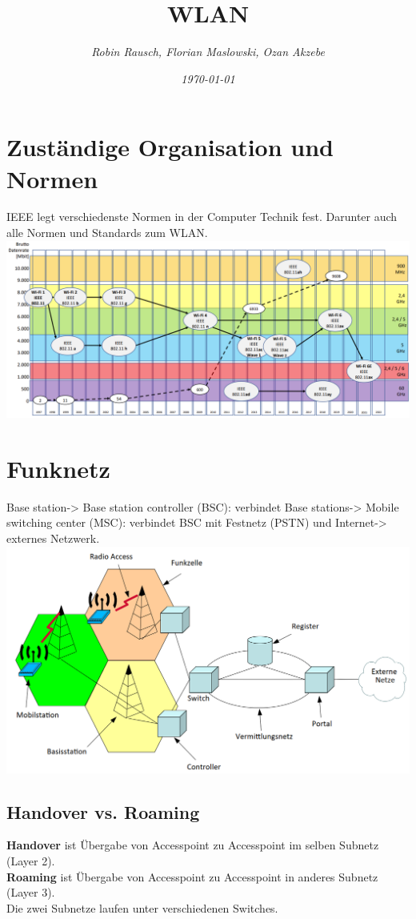 \documentclass[12pt,a4paper]{article}
\author{\slshape Robin Rausch, Florian Maslowski, Ozan Akzebe}
\title{WLAN}
\date{\slshape \today}
\begin{document}
\maketitle
\tableofcontents
\newpage

\section{Zuständige Organisation und Normen}
IEEE legt verschiedenste Normen in der Computer Technik fest. Darunter auch alle Normen und Standards zum WLAN.\\
\includegraphics[width=\textwidth]{Bilder/wlan_standards_uebersicht.PNG}

\section{Funknetz}
	Base station-> Base station controller (BSC): verbindet Base stations-> Mobile switching center (MSC): verbindet BSC mit Festnetz (PSTN) und Internet-> externes Netzwerk.\\
	\includegraphics[width=\textwidth]{Bilder/Funknetz.png}

	\subsection*{Handover vs. Roaming}
		\textbf{Handover} ist Übergabe von Accesspoint zu Accesspoint im selben Subnetz (Layer 2).\\
		\textbf{Roaming} ist Übergabe von Accesspoint zu Accesspoint in anderes Subnetz (Layer 3). \\
		Die zwei Subnetze laufen unter verschiedenen Switches.
\end{document}
